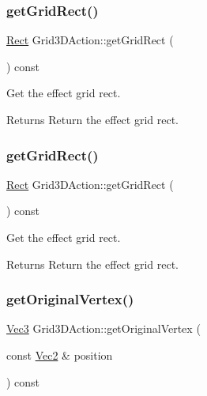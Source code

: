 \subsubsection{\texorpdfstring{get\+Grid\+Rect()}{getGridRect()}\hspace{0.1cm}{\footnotesize\ttfamily [1/2]}}
{\footnotesize\ttfamily \hyperlink{classRect}{Rect} Grid3\+D\+Action\+::get\+Grid\+Rect (\begin{DoxyParamCaption}{ }\end{DoxyParamCaption}) const}



Get the effect grid rect. 

\begin{DoxyReturn}{Returns}
Return the effect grid rect. 
\end{DoxyReturn}
\mbox{\label{classGrid3DAction_a5e488a9ee6a5605725f01a8a30a55975}} 
\subsubsection{\texorpdfstring{get\+Grid\+Rect()}{getGridRect()}\hspace{0.1cm}{\footnotesize\ttfamily [2/2]}}
{\footnotesize\ttfamily \hyperlink{classRect}{Rect} Grid3\+D\+Action\+::get\+Grid\+Rect (\begin{DoxyParamCaption}{ }\end{DoxyParamCaption}) const}



Get the effect grid rect. 

\begin{DoxyReturn}{Returns}
Return the effect grid rect. 
\end{DoxyReturn}
\mbox{\label{classGrid3DAction_a8e614d5c3c368b1f2eee4a3e885f861f}} 
\subsubsection{\texorpdfstring{get\+Original\+Vertex()}{getOriginalVertex()}\hspace{0.1cm}{\footnotesize\ttfamily [1/2]}}
{\footnotesize\ttfamily \hyperlink{classVec3}{Vec3} Grid3\+D\+Action\+::get\+Original\+Vertex (\begin{DoxyParamCaption}\item[{const \hyperlink{classVec2}{Vec2} \&}]{position }\end{DoxyParamCaption}) const}



